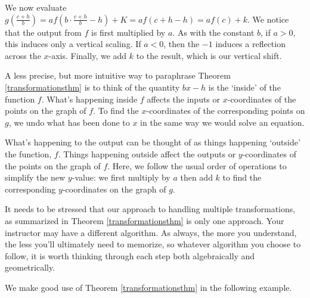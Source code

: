 \smallskip

We now evaluate $g\left( \frac{c+h}{b}\right) = a f\left(b \cdot \frac{c+h}{b} -h \right) + K = a f(c+h-h) =  a f(c)+k$.  We notice that the output from $f$ is first multiplied by $a$.  As with the constant $b$, if $a > 0$, this induces only a vertical scaling.  If $a < 0$, then the $-1$ induces a reflection across the $x$-axis.  Finally, we add $k$ to the result, which is our vertical shift.  

\smallskip

A less precise, but more intuitive way to paraphrase Theorem \ref{transformationsthm} is to think of the quantity $bx-h$ is the `inside' of the function $f$.  What's happening inside $f$ affects the inputs or $x$-coordinates of the points on the graph of $f$.  To find the $x$-coordinates of the corresponding points on $g$, we undo what has been done to $x$ in the same way we would solve an equation.  

\smallskip

What's happening to the output can be thought of as things happening `outside' the function, $f$.  Things happening outside affect the outputs or $y$-coordinates of the points on the graph of $f$.  Here, we follow the usual order of operations to simplify the new $y$-value: we first multiply by $a$ then add $k$ to find the corresponding $y$-coordinates on the graph of $g$.

\smallskip

It needs to be stressed that our approach to handling multiple transformations, as summarized in Theorem \ref{transformationsthm} is only one approach. Your instructor may have a different algorithm.  As always, the more you understand, the less you'll ultimately need to memorize, so whatever algorithm you choose to follow, it is worth thinking through each step both algebraically and geometrically.  

\smallskip

We make good use of Theorem \ref{transformationsthm}  in the following example.


